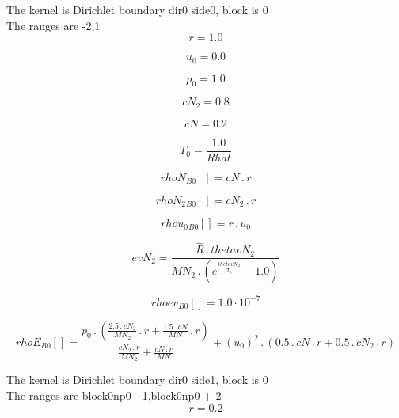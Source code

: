 \documentclass{article}
\begin{document}
\noindent The kernel is Dirichlet boundary dir0 side0, block is 0\\\noindent The ranges are -2,1\\\begin{dmath}r = 1.0\end{dmath}

\begin{dmath}u_{0} = 0.0\end{dmath}

\begin{dmath}p_{0} = 1.0\end{dmath}

\begin{dmath}cN_{2} = 0.8\end{dmath}

\begin{dmath}cN = 0.2\end{dmath}

\begin{dmath}T_{0} = \frac{1.0}{Rhat}\end{dmath}

\begin{dmath}{rhoN{_{B0}}}[{}] = cN \,.\, r\end{dmath}

\begin{dmath}{rhoN_{2}{_{B0}}}[{}] = cN_{2} \,.\, r\end{dmath}

\begin{dmath}{rhou_{0}{_{B0}}}[{}] = r \,.\, u_{0}\end{dmath}

\begin{dmath}evN_{2} = \frac{\hat{R} \,.\, thetavN_{2}}{MN_{2} \,.\, \left(e^{\frac{thetavN_{2}}{T_{0}}} - 1.0\right)}\end{dmath}

\begin{dmath}{rhoev{_{B0}}}[{}] = 1.0 \cdot 10^{-7}\end{dmath}

\begin{dmath}{rhoE{_{B0}}}[{}] = \frac{p_{0} \,.\, \left(\frac{2.5 \,.\, cN_{2}}{MN_{2}} \,.\, r + \frac{1.5 \,.\, cN}{MN} \,.\, r\right)}{\frac{cN_{2} \,.\, r}{MN_{2}} + \frac{cN \,.\, r}{MN}} + \left(u_{0} \right)^{2} \,.\, \left(0.5 \,.\, cN \,.\, 
r + 0.5 \,.\, cN_{2} \,.\, r\right)\end{dmath}

\noindent The kernel is Dirichlet boundary dir0 side1, block is 0\\\noindent The ranges are block0np0 - 1,block0np0 + 2\\\begin{dmath}r = 0.2\end{dmath}
\end{document}

